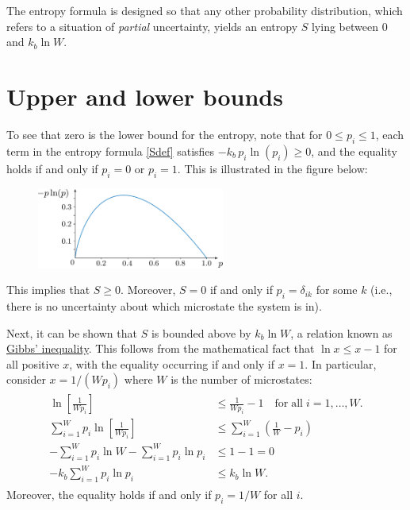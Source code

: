 \documentclass[pra,12pt]{revtex4}
\begin{document}
\noindent
The entropy formula is designed so that any other probability
distribution, which refers to a situation of \textit{partial}
uncertainty, yields an entropy $S$ lying between $0$
and $k_b \ln W$.

\pagebreak

\section{Upper and lower bounds}

To see that zero is the lower bound for the entropy, note that for $0
\le p_i \le 1$, each term in the entropy formula \eqref{Sdef}
satisfies $-k_b\, p_i\ln(p_i) \ge 0$, and the equality holds if and
only if $p_i = 0$ or $p_i = 1$.  This is illustrated in the figure
below:

\begin{figure}[h!]
  \includegraphics[width=0.55\textwidth]{plogp}
\end{figure}

\noindent
This implies that $S\ge 0$.  Moreover, $S = 0$ if and only if $p_i =
\delta_{ik}$ for some $k$ (i.e., there is no uncertainty about which
microstate the system is in).

Next, it can be shown that $S$ is bounded above by $k_b \ln W$, a
relation known as
\href{https://en.wikipedia.org/wiki/Gibbs\%27_inequality}{Gibbs'
  inequality}.  This follows from the mathematical fact that $\ln x
\le x - 1$ for all positive $x$, with the equality occurring if and
only if $x = 1$.  In particular, consider $x = 1/(Wp_i)$ where $W$ is
the number of microstates:
\begin{align}
  \begin{aligned}
    \ln \left[\frac{1}{Wp_i}\right] &\le \frac{1}{Wp_i} - 1
    \quad \textrm{for}\;\textrm{all}\; i = 1,\dots, W. \\
    \sum_{i=1}^W p_i \ln \left[\frac{1}{Wp_i}\right]
    &\le \sum_{i=1}^W \left(\frac{1}{W} - p_i\right) \\
    - \sum_{i=1}^W p_i \ln W - \sum_{i=1}^W p_i \ln p_i
    &\le 1 - 1 = 0 \\
    - k_b \sum_{i=1}^W p_i \ln p_i &\le k_b \ln W.
  \end{aligned}
\end{align}
Moreover, the equality holds if and only if $p_i = 1/W$ for all $i$.
\end{document}
